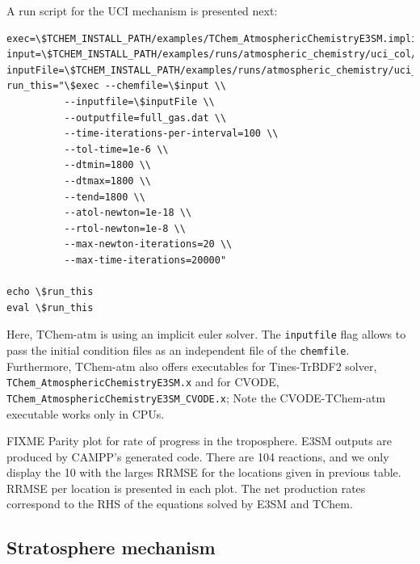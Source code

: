 \documentclass[report, 12pt]{SANDreport}
\begin{document}
A run script for the UCI mechanism is presented next:

\begin{verbatim}
exec=\$TCHEM_INSTALL_PATH/examples/TChem_AtmosphericChemistryE3SM.implicit_euler.x
input=\$TCHEM_INSTALL_PATH/examples/runs/atmospheric_chemistry/uci_col/uci_v2_test3.yaml
inputFile=\$TCHEM_INSTALL_PATH/examples/runs/atmospheric_chemistry/uci_col/input_conditions_multi_col.yaml
run_this="\$exec --chemfile=\$input \\
          --inputfile=\$inputFile \\
          --outputfile=full_gas.dat \\
          --time-iterations-per-interval=100 \\
          --tol-time=1e-6 \\
          --dtmin=1800 \\
          --dtmax=1800 \\
          --tend=1800 \\
          --atol-newton=1e-18 \\
          --rtol-newton=1e-8 \\
          --max-newton-iterations=20 \\
          --max-time-iterations=20000"

echo \$run_this
eval \$run_this
\end{verbatim}


Here, TChem-atm is using an implicit euler solver. The \verb|inputfile| flag allows to pass the initial condition files as an independent file of the \verb|chemfile|. Furthermore, TChem-atm also offers executables for Tines-TrBDF2 solver, \verb|TChem_AtmosphericChemistryE3SM.x| and for CVODE, \verb|TChem_AtmosphericChemistryE3SM_CVODE.x|; Note the CVODE-TChem-atm executable works only in CPUs.

FIXME
Parity plot for rate of progress in the troposphere. E3SM outputs are produced by CAMPP’s generated code. There are 104 reactions, and we only display the 10 with the larges RRMSE for the locations given in previous table. RRMSE per location is presented in each plot. The net production rates correspond to the RHS of the equations solved by E3SM and TChem.


\subsection{Stratosphere mechanism}
\end{document}

